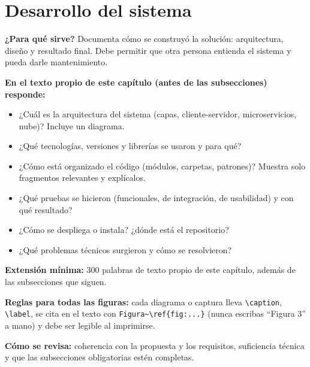 
\section{Desarrollo del sistema} \label{sec:desarrollo_sistema} %

\begin{guia}
\textbf{¿Para qué sirve?} Documenta cómo se construyó la solución: arquitectura, diseño y resultado final. Debe permitir
que otra persona entienda el sistema y pueda darle mantenimiento.

\textbf{En el texto propio de este capítulo (antes de las subsecciones) responde:}
\begin{itemize}[nosep,leftmargin=*]
  \item ¿Cuál es la arquitectura del sistema (capas, cliente-servidor, microservicios, nube)? Incluye un diagrama.
  \item ¿Qué tecnologías, versiones y librerías se usaron y para qué?
  \item ¿Cómo está organizado el código (módulos, carpetas, patrones)? Muestra solo fragmentos relevantes y explícalos.
  \item ¿Qué pruebas se hicieron (funcionales, de integración, de usabilidad) y con qué resultado?
  \item ¿Cómo se despliega o instala? ¿dónde está el repositorio?
  \item ¿Qué problemas técnicos surgieron y cómo se resolvieron?
\end{itemize}

\textbf{Extensión mínima:} 300 palabras de texto propio de este capítulo, además de las subsecciones que siguen.

\textbf{Reglas para todas las figuras:} cada diagrama o captura lleva \verb|\caption|, \verb|\label|, se cita en el texto con
\verb|Figura~\ref{fig:...}| (nunca escribas ``Figura 3'' a mano) y debe ser legible al imprimirse.

\textbf{Cómo se revisa:} coherencia con la propuesta y los requisitos, suficiencia técnica y que las subsecciones
obligatorias estén completas.
\end{guia}

